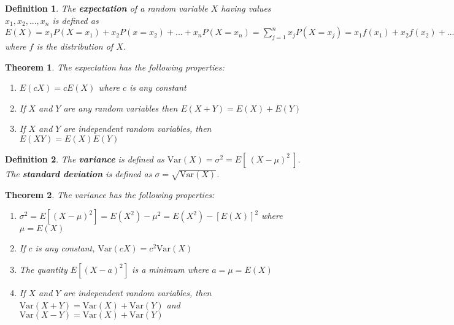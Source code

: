 \documentclass[12pt,twoside]{report}
\newtheorem{defn}{Definition}
\newtheorem{thm}{Theorem}
\begin{document}
\begin{defn}
    The \textbf{expectation} of a random variable $X$ having values $x_1, x_2, ..., x_n$ is defined as $E\left (X\right ) = x_1  P\left (X = x_1\right ) + x_2 P\left (x = x_2\right ) + ... + x_n P\left (X = x_n\right ) =  \sum_{j = 1}^n x_j P\left (X = x_j\right ) = x_1 f\left (x_1\right ) + x_2 f\left (x_2\right ) + ... + x_n f\left (x_n\right ) = \sum_{j=1}^n x_j f\left (x_j\right )$ where $f$ is the distribution of $X$.
\end{defn}


\begin{samepage}
\begin{thm}
    The expectation has the following properties:

    \begin{enumerate}
        \item $E(c X) = c E(X)$ where $c$ is any constant
        \item If $X$ and $Y$ are any random variables then $E(X + Y) = E(X) + E(Y)$
        \item If $X$ and $Y$ are independent random variables, then $E(XY) = E(X)E(Y)$
    \end{enumerate}
\end{thm}
\end{samepage}

\begin{defn}
    The \textbf{variance} is defined as $\text{Var} (X) = \sigma ^2 = E[ \  (X - \mu)^2 \  ]$.
    The \textbf{standard deviation} is defined as $\sigma = \sqrt{\text{Var} (X)}$.
\end{defn}

\begin{samepage}
\begin{thm}
    The variance has the following properties:

    \begin{enumerate}
        \item $\sigma ^2 = E\left [ \left (X - \mu \right ) ^2 \right ] = E\left (X ^2\right ) - \mu ^2 = E\left (X ^2\right ) - \left [E\left (X\right )\right ] ^2$ where $\mu = E\left (X\right )$
        \item If $c$ is any constant, $\text{Var}(cX) = c^2 \text{Var}(X)$
        \item The quantity $E[ (X - a)^2 ]$ is a minimum where $a = \mu = E(X)$
        \item If $X$ and $Y$ are independent random variables, then \\ $\text{Var}(X+Y) = \text{Var}(X) + \text{Var}(Y)$ and $\text{Var}(X-Y) = \text{Var}(X) + \text{Var}(Y)$
    \end{enumerate}
\end{thm}
\end{samepage}
\end{document}
